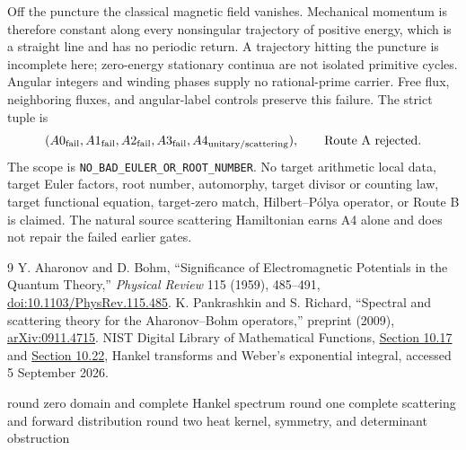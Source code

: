 \documentclass[10pt]{article}
\begin{document}
Off the puncture the classical magnetic field vanishes. Mechanical momentum
is therefore constant along every nonsingular trajectory of positive energy,
which is a straight line and has no periodic return. A trajectory hitting the
puncture is incomplete here; zero-energy stationary continua are not isolated
primitive cycles. Angular integers and winding phases supply no rational-prime
carrier. Free flux, neighboring fluxes, and angular-label controls preserve
this failure. The strict tuple is
\begin{equation}
(A0_{\rm fail},A1_{\rm fail},A2_{\rm fail},A3_{\rm fail},
A4_{\rm unitary/scattering}),\qquad \text{Route A rejected}.
\label{eq:route}
\end{equation}
The scope is \texttt{NO\_BAD\_EULER\_OR\_ROOT\_NUMBER}. No target arithmetic
local data, target Euler factors, root number, automorphy, target divisor or
counting law, target functional equation, target-zero match,
Hilbert--P\'olya operator, or Route B is claimed. The natural source scattering
Hamiltonian earns A4 alone and does not repair the failed earlier gates.
\fi

\begin{thebibliography}{9}
 Y. Aharonov and D. Bohm, ``Significance of Electromagnetic
Potentials in the Quantum Theory,'' \emph{Physical Review} 115 (1959),
485--491, \href{https://doi.org/10.1103/PhysRev.115.485}{doi:10.1103/PhysRev.115.485}.
 K. Pankrashkin and S. Richard, ``Spectral and scattering theory
for the Aharonov--Bohm operators,'' preprint (2009),
\href{https://arxiv.org/abs/0911.4715}{arXiv:0911.4715}.
 NIST Digital Library of Mathematical Functions,
\href{https://dlmf.nist.gov/10.17}{Section 10.17} and
\href{https://dlmf.nist.gov/10.22}{Section 10.22},
Hankel transforms and Weber's exponential integral, accessed 5 September 2026.
\end{thebibliography}
\bigskip
\begin{center}\small\sffamily
\ifcase\CRevisionRound
round zero domain and complete Hankel spectrum
\or
round one complete scattering and forward distribution
\else
round two heat kernel, symmetry, and determinant obstruction
\fi
\end{center}
\end{document}
